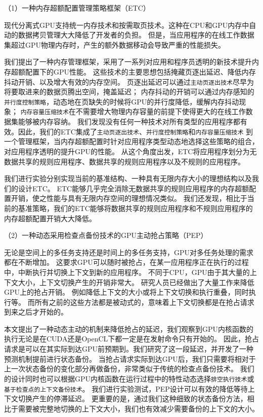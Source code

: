 （1）一种内存超额配置管理策略框架（ETC）

现代分离式GPU支持统一内存技术和按需取页技术。这种在CPU和GPU内存中自动的数据拷贝管理大大降低了开发者的负担。
但是，当应用程序的在线工作数据集超过GPU物理内存时，产生的额外数据移动会导致严重的性能损失。

我们提出了一种内存管理框架，采用了一系列对应用和程序员透明的新技术提升内存超额配置下的GPU性能。
这些技术的主要思想包括掩藏页逐出延迟、降低内存抖动开销、以及增大有效的内存空间。
页逐出延迟可以通过\texttt{主动页逐出技术}尽早为将要取进来的数据页腾出空间，掩盖延迟；
内存抖动的开销可以通过内存感知的\texttt{并行度控制策略}，动态地在页缺失的时候将GPU的并行度降低，缓解内存抖动现象；
\texttt{内存容量压缩技术}在不需要增大物理内存容量的前提下使得更大的在线工作数据集能够被内存容纳。
我们发现没有任何一种技术对所有类型的应用程序都有效。因此，我们的ETC集成了\texttt{主动页逐出技术}、\texttt{并行度控制策略}和\texttt{内存容量压缩技术}
到一个管理框架，当内存超额配置时针对应用程序类型动态地选择这些策略的组合，对应用程序透明的提升GPU的性能。
从这个角度出发，ETC将应用程序划分为无数据共享的规则应用程序、数据共享的规则应用程序以及不规则的应用程序。

我们进行实验分别实现当前的基准结构、一种具有无限内存大小的理想结构以及我们的设计ETC。
ETC能够几乎完全消除无数据共享的规则应用程序的内存超额配置开销，使之性能与具有无限内存空间的理想情况类似。
我们还发现，相比于当前的基准策略，我们的ETC能够将数据共享的规则应用程序和不规则应用程序的内存超额配置开销大大降低。

（2）一种动态采用检查点备份技术的GPU主动抢占策略（PEP）

无论是空间上的多任务支持还是时间上的多任务支持，GPU对多任务处理的需求都在不断增加。
这要求GPU可以随时被抢占，在某一应用程序正在执行的过程中，中断执行并切换上下文到新的应用程序。
不同于CPU，GPU由于其大量的上下文大小，上下文切换产生的开销非常大。
研究人员已经做出了大量工作来降低GPU上的抢占开销。
例如降低上下文的大小或将上下文切换和执行重叠，同时执行等。
而所有之前的这些方法都是被动式的，意味着上下文切换都是在抢占请求到来之后才开始的。

本文提出了一种动态主动的机制来降低抢占的延迟，我们观察到GPU内核函数的执行无论是在CUDA还是OpenCL下都一定是在发射命令只有开始的。
因此，抢占请求是可以在其实际到达GPU前预期到。我们研究了这一段延迟，并开发了一种预测机制提前进行状态备份。
当抢占请求实际到达GPU后，我们只需要将相对于上一次状态备份的变化部分再做备份，非常类似于传统的检查点备份技术。
我们的设计同时也可以根据GPU内核函数在运行过程中的特性动态选择\texttt{排空执行技术}或\texttt{基于检查点的上下文备份技术}。
我们进行实验测试，PEP设计可以有效的降低等待上下文切换产生的停滞延迟。
更重要的是，通过我们这种细致的状态备份方法，相比于需要被完整地切换的上下文大小，我们也有效减少需要备份的上下文的大小。

